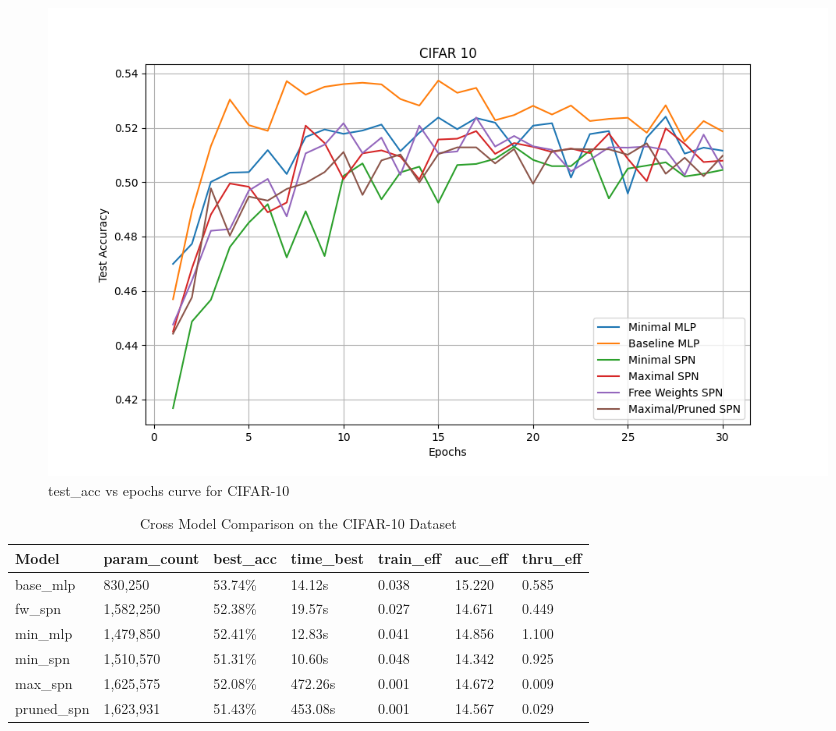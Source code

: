 \begin{figure}[H]
    \centering
    \includegraphics[width=\linewidth]{Figures/Results/CIFAR_10/test_accuracy_plot.png} %
    \captionsetup{width=\linewidth}
    \caption{test\_acc vs epochs curve for CIFAR-10}
    \label{fig:cifarTestCurve}
\end{figure}

\begin{table}[h!]
    \centering
    \caption{Cross Model Comparison on the CIFAR-10 Dataset}
    \begin{tabular}{|l|l|l|l|l|l|l|}
    \hline
    \textbf{Model} & \textbf{param\_count} & \textbf{best\_acc} & \textbf{time\_best} & \textbf{train\_eff} & \textbf{auc\_eff} & \textbf{thru\_eff} \\
    \hline
    base\_mlp & 830,250 & \cellcolor{green!25}53.74\% & 14.12s & 0.038 & \cellcolor{green!25}15.220 & 0.585 \\
    fw\_spn & 1,582,250 & 52.38\% & 19.57s & 0.027 & 14.671 & 0.449 \\
    min\_mlp & 1,479,850 & 52.41\% & 12.83s & 0.041 & 14.856 & \cellcolor{green!25}1.100 \\
    min\_spn & 1,510,570 & \cellcolor{red!25}51.31\% & \cellcolor{green!25}10.60s & \cellcolor{green!25}0.048 & \cellcolor{red!25}14.342 & 0.925 \\
    max\_spn & 1,625,575 & 52.08\% & \cellcolor{red!25}472.26s & \cellcolor{red!25}0.001 & 14.672 & \cellcolor{red!25}0.009 \\
    pruned\_spn & 1,623,931 & 51.43\% & 453.08s & \cellcolor{red!25}0.001 & 14.567 & 0.029 \\
    \hline
    \end{tabular}
    \label{tab:cifarResults}
\end{table}

